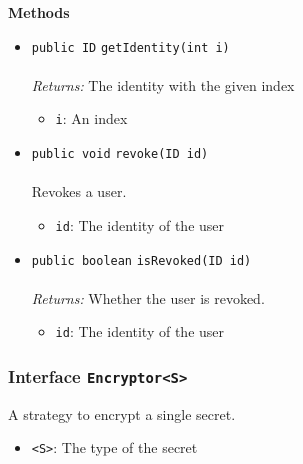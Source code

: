 \textbf{\sffamily Methods}
\begin{itemize}
\item \lstinline|public ID| \lstinline|getIdentity|\lstinline|(int i)|\\ \\[-0.6em]
\emph{Returns:} The identity with the given index
\begin{itemize}
\item \lstinline|i|: An index
\end{itemize}



\item \lstinline|public void| \lstinline|revoke|\lstinline|(ID id)|\\ \\[-0.6em]
Revokes a user.
\begin{itemize}
\item \lstinline|id|: The identity of the user
\end{itemize}



\item \lstinline|public boolean| \lstinline|isRevoked|\lstinline|(ID id)|\\ \\[-0.6em]
\emph{Returns:} Whether the user is revoked.
\begin{itemize}
\item \lstinline|id|: The identity of the user
\end{itemize}



\end{itemize}

\subsubsection{Interface \lstinline|Encryptor<S>|}
A strategy to encrypt a single secret. \\
\noindent\begin{minipage}[t]{5cm}
\vspace{0.3em}
\hspace*{2em}
\vspace{0.3em}
\end{minipage}

\begin{itemize}
\item \lstinline|<S>|: The type of the secret
\end{itemize}




